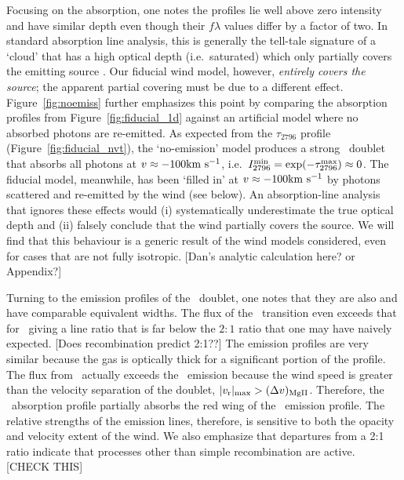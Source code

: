 \documentclass[12pt,preprint]{aastex}
\begin{document}
Focusing on the  absorption, one notes the profiles lie
well above zero intensity and have similar depth even though their $f\lambda$
values differ by a factor of two.  In standard absorption line
analysis, this is generally 
the tell-tale signature of a `cloud' that has a high optical depth (i.e.\
saturated) which only partially covers the emitting source
\citep[e.g.][]{hamman10}.  Our fiducial wind model, however, 
{\it entirely covers the source}; the apparent partial covering must
be due to a different effect.
Figure~\ref{fig:noemiss} further emphasizes this point by comparing the 
absorption profiles from Figure~\ref{fig:fiducial_1d} against an
artificial model where no absorbed photons are 
re-emitted.   As expected from the
$\tau_{2796}$ profile (Figure~\ref{fig:fiducial_nvt}), the
`no-emission' model
produces a strong \mgiid\ doublet that absorbs all photons at
$v \approx -100 {\rm km~s^{-1}}$, i.e.\ $I_{2796}^{\rm min} = \exp(-\tau^{\rm
  max}_{2796}) \approx 0$.
The fiducial model, meanwhile, has been `filled in' at $v \approx -100
{\rm km~s^{-1}}$ by photons scattered and re-emitted by the wind (see below).  An
absorption-line analysis that ignores these effects
\citep[e.g.][]{sato} would (i) systematically underestimate the true optical
depth and (ii) falsely conclude that the wind partially covers the
source.  We will find that this
behaviour is a generic result of the wind models considered, even for cases that are
not fully isotropic.
[Dan's analytic calculation here? or Appendix?]

Turning to the emission profiles of the \mgiid\ doublet, one notes
that they are also and have comparable equivalent widths.  The
flux of the \mgiib\ transition even exceeds that for \mgiia\ giving a
line ratio that is far below the $2:1$ ratio that one may have naively
expected. 
[Does recombination predict 2:1??]
The emission profiles are very similar because the gas is optically
thick for a significant portion of the profile. 
The flux from \mgiib\ actually exceeds the
\mgiia\ emission because the wind speed is greater than the velocity separation
of the doublet, $|v_{\rm r}|_{\rm max} > (\Delta v)_{\rm MgII}$.
Therefore,
the \mgiib\ absorption profile partially absorbs the red wing of the
\mgiia\ emission profile.  The relative strengths of the emission
lines, therefore, is sensitive to both the opacity and velocity
extent of the wind.  We also emphasize that departures from a 2:1
ratio indicate that processes other than simple recombination are
active.  [CHECK THIS]
\end{document}
